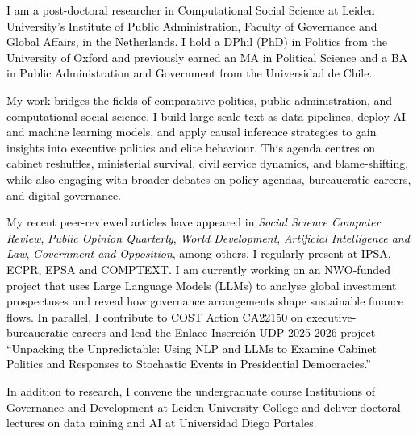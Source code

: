 




\vspace{3mm}

\begin{cvparagraph}

\textcolor{black}{I am a post-doctoral researcher in Computational Social Science at Leiden University’s Institute of Public Administration, Faculty of Governance and Global Affairs, in the Netherlands. I hold a DPhil (PhD) in Politics from the University of Oxford and previously earned an MA in Political Science and a BA in Public Administration and Government from the Universidad de Chile.}

\textcolor{black}{My work bridges the fields of comparative politics, public administration, and computational social science. I build large-scale text-as-data pipelines, deploy AI and machine learning models, and apply causal inference strategies to gain insights into executive politics and elite behaviour. This agenda centres on cabinet reshuffles, ministerial survival, civil service dynamics, and blame-shifting, while also engaging with broader debates on policy agendas, bureaucratic careers, and digital governance.}

\textcolor{black}{My recent peer-reviewed articles have appeared in {\itshape Social Science Computer Review}, {\itshape Public Opinion Quarterly}, {\itshape World Development}, {\itshape Artificial Intelligence and Law}, {\itshape Government and Opposition}, among others. I regularly present at IPSA, ECPR, EPSA and COMPTEXT. I am currently working on an NWO-funded project that uses Large Language Models (LLMs) to analyse global investment prospectuses and reveal how governance arrangements shape sustainable finance flows. In parallel, I contribute to COST Action CA22150 on executive-bureaucratic careers and lead the Enlace-Inserción UDP 2025-2026 project “Unpacking the Unpredictable: Using NLP and LLMs to Examine Cabinet Politics and Responses to Stochastic Events in Presidential Democracies.”}

\textcolor{black}{In addition to research, I convene the undergraduate course Institutions of Governance and Development at Leiden University College and deliver doctoral lectures on data mining and AI at Universidad Diego Portales.}
\vspace{1mm}
\end{cvparagraph}
